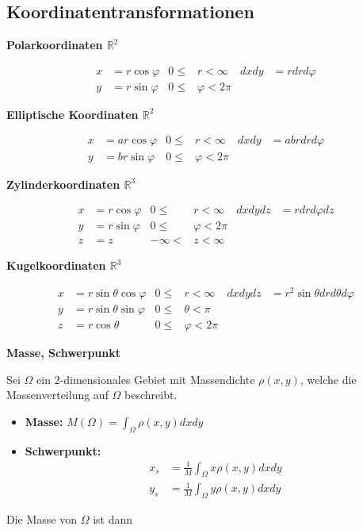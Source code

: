 \documentclass[25pt]{sciposter}
\newcommand{\R}{\mathbb{R}}
\newenvironment{method}[1]{\begin{mdframed}[backgroundcolor=blue!10,innertopmargin=15pt, innerbottommargin=15pt, nobreak=true]
		\textbf{#1 }
	}
	{ 
	\end{mdframed}
}
\begin{document}
\begin{multicols}{3}
\subsection*{Koordinatentransformationen}

\textbf{Polarkoordinaten $\R^2$}

\begin{align*}
	x &= r\cos\varphi  & 0 \leq &r < \infty & dxdy &= rdrd\varphi\\
	y &= r\sin\varphi  & 0 \leq &\varphi < 2\pi & & 
\end{align*}


\textbf{Elliptische Koordinaten $\R^2$}

\begin{align*}
	x &= ar\cos\varphi  & 0 \leq &r < \infty & dxdy &= abrdrd\varphi\\
	y &= br\sin\varphi  & 0 \leq &\varphi < 2\pi & & 
\end{align*}


\textbf{Zylinderkoordinaten $\R^3$}

\begin{align*}
x &= r\cos\varphi  & 0 \leq &r < \infty & dxdydz &= r dr d\varphi dz\\
y &= r\sin\varphi  & 0 \leq &\varphi < 2\pi & & \\
z &= z  &   -\infty < &z < \infty & & 
\end{align*}

\textbf{Kugelkoordinaten $\R^3$}

\begin{align*}
x &= r\sin\theta\cos\varphi  & 0 \leq &r < \infty & dxdydz&=r^2 \sin \theta drd\theta d\varphi\\
y &=r\sin\theta\sin\varphi  & 0 \leq &\theta < \pi & & \\
z &= r\cos\theta  &  0 \leq &\varphi < 2\pi & & 
\end{align*}


\begin{method}{Masse, Schwerpunkt}
	Sei $\Omega$ ein 2-dimensionales Gebiet mit Massendichte $\rho(x,y)$, welche die Massenverteilung auf $\Omega$ beschreibt.
	
	\begin{itemize}
		\item \textbf{Masse:} $M(\Omega) = \int_{\Omega} \rho(x,y) dx dy$
		\item \textbf{Schwerpunkt:} \begin{align*}x_s &= \frac{1}{M} \int_{\Omega} x\rho(x,y) dx dy \\ y_s &= \frac{1}{M} \int_{\Omega} y\rho(x,y) dx dy \end{align*}
	\end{itemize}
	 Die Masse von $\Omega$ ist dann
	 

\end{method}
\end{multicols}
\end{document}
